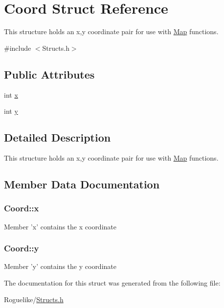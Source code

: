 \hypertarget{struct_coord}{\section{Coord Struct Reference}
\label{struct_coord}
}


This structure holds an x,y coordinate pair for use with \hyperlink{class_map}{Map} functions.  




{\ttfamily \#include $<$Structs.\-h$>$}

\subsection*{Public Attributes}
\begin{DoxyCompactItemize}
\item 
int \hyperlink{struct_coord_af53179d4a1e0ec2934521d0cc5f7f3f7}{x}
\item 
int \hyperlink{struct_coord_a98d60068df0cb48ec080ad14f62a05b9}{y}
\end{DoxyCompactItemize}


\subsection{Detailed Description}
This structure holds an x,y coordinate pair for use with \hyperlink{class_map}{Map} functions. 

\subsection{Member Data Documentation}
\hypertarget{struct_coord_af53179d4a1e0ec2934521d0cc5f7f3f7}{
\subsubsection[{x}]{\setlength{\rightskip}{0pt plus 5cm}Coord\-::x}}\label{struct_coord_af53179d4a1e0ec2934521d0cc5f7f3f7}
Member 'x' contains the x coordinate \hypertarget{struct_coord_a98d60068df0cb48ec080ad14f62a05b9}{
\subsubsection[{y}]{\setlength{\rightskip}{0pt plus 5cm}Coord\-::y}}\label{struct_coord_a98d60068df0cb48ec080ad14f62a05b9}
Member 'y' contains the y coordinate 

The documentation for this struct was generated from the following file\-:\begin{DoxyCompactItemize}
\item 
Roguelike/\hyperlink{_structs_8h}{Structs.\-h}\end{DoxyCompactItemize}
